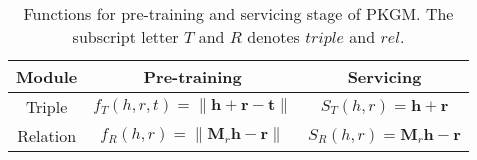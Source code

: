 \begin{table}[t]
    \centering
    \caption{Functions for pre-training and servicing stage of PKGM. The subscript letter $T$ and $R$ denotes $triple$ and $rel$.}
    \begin{tabular}{c|c | c}
    \toprule
        Module & Pre-training & Servicing \\
         \midrule
        Triple 
        & $f_{T}(h,r,t) = \|\mathbf{h} + \mathbf{r} - \mathbf{t}\|$    
        & $S_{T}(h,r) = \mathbf{h} + \mathbf{r}$ \\
        \midrule
        Relation
        & $f_{R}(h, r) = \| \mathbf{M}_r \mathbf{h} - \mathbf{r}\| $ 
        & $S_{R}(h, r) = \mathbf{M}_r \mathbf{h} - \mathbf{r}$\\
        \bottomrule
    \end{tabular}
    \label{tab:PKGM-functs}
\end{table}